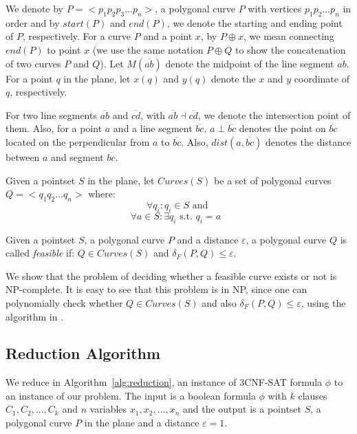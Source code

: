 \documentclass[a4paper,UKenglish]{lipics}
\newcommand{\eps}{\varepsilon}
\newcommand{\distF}{\delta_F}
\newcommand{\Seg}[1]{{\overline{#1}}}
\newcommand{\ap}{\oplus}
\newcommand{\pset}{S}
\begin{document}
\vspace{0.2 in}
\hspace{-0.2 in}{\bf Notations.}
We denote by $P = <p_1p_2p_3...p_n>$, a polygonal curve $P$
with vertices $p_1 p_2 \dots p_n$ in order 
and by $start(P)$ and $end(P)$, we denote 
the starting and ending point of $P$, respectively.
For a curve $P$ and a point $x$, by $P \ap x$, 
we mean connecting $end(P)$ to point $x$
(we use the same notation $P \ap Q$ to show the concatenation of 
two curves $P$ and $Q$).
Let $M(\Seg{ab})$ denote the  midpoint of the line segment $\Seg{ab}$. 
For a point $q$ in the plane, let $x(q)$ and $y(q)$
denote the $x$ and $y$ coordinate of $q$, respectively.


For two line segments $\Seg{ab}$ and $\Seg{cd}$, with $ \Seg{ab} \dashv	\Seg{cd}$,
we denote the intersection point of them. 
Also, 
for a point $a$ and a line segment $\Seg{bc}$,
$a \perp \Seg{bc}$ denotes the point on $\Seg{bc}$ located 
on the perpendicular from $a$ to $\Seg{bc}$. Also, 
$dist(a, \Seg{bc})$ denotes the distance 
between $a$ and segment $\Seg{bc}$.

\begin{definition} \label{def:feasible}
Given a pointset $\pset$ in the plane, let $Curves(\pset)$
be a set of polygonal curves $Q = <q_1 q_2 \dots q_n> $ where: 
$$  \forall{q_i} : q_i \in \pset \mbox{  and  } $$ 
$$  \forall{a} \in \pset: \exists{q_i} \mbox{  s.t. }  q_i = a \mbox{    } $$
\end{definition}

\begin{definition} \label{def:feasibleNPC}
Given a pointset $\pset$, a polygonal curve $P$ and a distance $\eps$, 
a polygonal curve $Q$ is called {\em feasible} if: 
$Q \in Curves(S)$ and $  \distF(P,Q) \le \eps$.
\end{definition}

We show that the problem of deciding whether a 
feasible curve exists or not  is NP-complete.
It is easy to see that this problem is in NP, since 
one can polynomially check whether $Q \in Curves(S)$
and also $\distF(P,Q) \le \eps$, using the algorithm in \cite{AltG95}.


\subsection{Reduction Algorithm}

We reduce in Algorithm~\ref{alg:reduction},
an instance of 3CNF-SAT formula $\phi$ 
to an instance of our problem.
The input is a boolean formula 
$\phi$ with $k$ clauses $C_1, C_2, \dots, C_k$ and $n$ variables $x_1, x_2, \dots,x_n$ 
and the output is a pointset $\pset$,
a polygonal curve $P$ in the plane and 
a distance $\eps = 1$.
\end{document}
